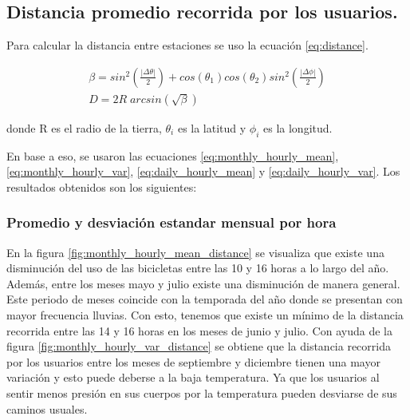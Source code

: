 \subsection{Distancia promedio recorrida por los usuarios.}

Para calcular la distancia entre estaciones se uso la ecuación \ref{eq:distance}.

\begin{equation}
    \begin{matrix}
        \beta = sin^2\left ( \frac{|\Delta \theta|}{2} \right ) + cos \left (\theta_1\right )  cos(\theta_2)sin^2 \left (\frac{|\Delta \phi|}{2} \right ) \\
        D     = 2R\;arcsin\left (\sqrt{\beta} \right )
    \end{matrix}
    \label{eq:distance}
\end{equation}

donde R es el radio de la tierra, $\theta_i$ es la latitud y $\phi_i$ es la longitud.

En base a eso, se usaron las ecuaciones \ref{eq:monthly_hourly_mean}, \ref{eq:monthly_hourly_var}, \ref{eq:daily_hourly_mean} y \ref{eq:daily_hourly_var}. Los resultados obtenidos son los siguientes:

\subsubsection{Promedio y desviación estandar mensual por hora}

En la figura \ref{fig:monthly_hourly_mean_distance} se visualiza que existe una disminución del uso de las bicicletas entre las 10 y 16 horas a lo largo del año. Además, entre los meses mayo y julio existe una disminución de manera general. Este periodo de meses coincide con la temporada del año donde se presentan con mayor frecuencia lluvias\cite{clima_guadalajara}. Con esto, tenemos que existe un mínimo de la distancia recorrida entre las 14 y 16 horas en los meses de junio y julio. Con ayuda de la figura \ref{fig:monthly_hourly_var_distance} se obtiene que la distancia recorrida por los usuarios entre los meses de septiembre y diciembre tienen una mayor variación y esto puede deberse a la baja temperatura\cite{clima_guadalajara}. Ya que los usuarios al sentir menos presión en sus cuerpos por la temperatura pueden desviarse de sus caminos usuales.

